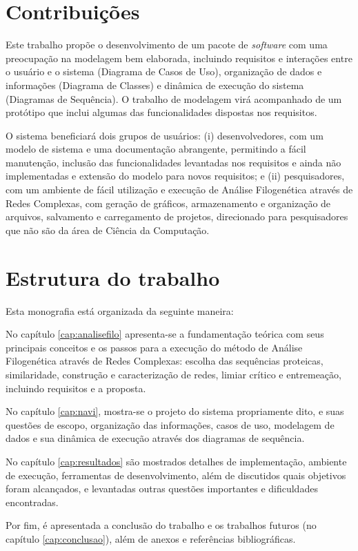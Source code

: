 \section{Contribuições}

Este trabalho propõe o desenvolvimento de um pacote de \textit{software} com uma preocupação na modelagem bem elaborada, incluindo requisitos e
interações entre o usuário
e o sistema (Diagrama de Casos de Uso), organização de dados e informações (Diagrama de Classes) e dinâmica de execução do sistema (Diagramas de Sequência).
O trabalho de modelagem virá acompanhado de um protótipo que inclui algumas das funcionalidades dispostas nos requisitos.

O sistema beneficiará dois grupos de usuários: (i) desenvolvedores, com um modelo de sistema e uma documentação abrangente, permitindo a fácil
manutenção, inclusão das funcionalidades levantadas nos requisitos e ainda não implementadas e extensão do modelo para novos requisitos; e (ii) pesquisadores,
com um ambiente de fácil utilização e execução de Análise Filogenética através de Redes Complexas, com geração de gráficos, armazenamento e organização de
arquivos, salvamento e carregamento de projetos, direcionado para pesquisadores que não são da área de Ciência da Computação.

\section{Estrutura do trabalho}

Esta monografia está organizada da seguinte maneira:

No capítulo \ref{cap:analisefilo} apresenta-se a fundamentação teórica com seus principais conceitos
e os passos para a execução do método de Análise Filogenética através de Redes Complexas: escolha das sequências proteicas,
similaridade, construção e caracterização de redes, limiar crítico e entremeação, incluindo requisitos e a proposta.

No capítulo \ref{cap:navi}, mostra-se o projeto do sistema propriamente dito, e suas questões
de escopo, organização das informações, casos de uso, modelagem de dados e sua dinâmica de execução através dos diagramas de sequência.

No capítulo \ref{cap:resultados} são mostrados detalhes de implementação, ambiente de execução, ferramentas de
desenvolvimento, além de discutidos quais objetivos foram alcançados, e levantadas outras questões importantes e dificuldades encontradas.

Por fim, é apresentada a conclusão do trabalho e os trabalhos futuros (no capítulo \ref{cap:conclusao}), além de anexos e referências bibliográficas.





